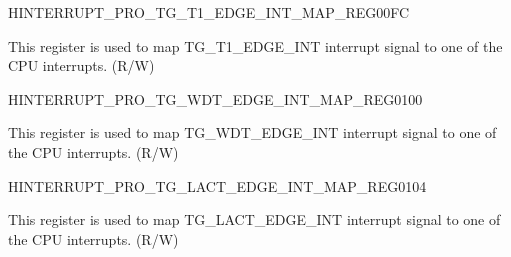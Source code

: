 \begin{register}{H}{INTERRUPT\_PRO\_TG\_T1\_EDGE\_INT\_MAP\_REG}{\hexprefix{}00FC}\label{regdesc:INTERRUPTPROTGT1EDGEINTMAPREG}
%
%
\regnewline%
\begin{regdesc}\begin{reglist}
\label{fielddesc:INTERRUPTPROTGT1EDGEINTMAP}\item [INTERRUPT\_PRO\_TG\_T1\_EDGE\_INT\_MAP] This register is used to map TG\_T1\_EDGE\_INT interrupt signal to one of the CPU interrupts. (R/W)
\end{reglist}\end{regdesc}
\end{register}


\begin{register}{H}{INTERRUPT\_PRO\_TG\_WDT\_EDGE\_INT\_MAP\_REG}{\hexprefix{}0100}\label{regdesc:INTERRUPTPROTGWDTEDGEINTMAPREG}
%
%
\regnewline%
\begin{regdesc}\begin{reglist}
\label{fielddesc:INTERRUPTPROTGWDTEDGEINTMAP}\item [INTERRUPT\_PRO\_TG\_WDT\_EDGE\_INT\_MAP] This register is used to map TG\_WDT\_EDGE\_INT interrupt signal to one of the CPU interrupts. (R/W)
\end{reglist}\end{regdesc}
\end{register}


\begin{register}{H}{INTERRUPT\_PRO\_TG\_LACT\_EDGE\_INT\_MAP\_REG}{\hexprefix{}0104}\label{regdesc:INTERRUPTPROTGLACTEDGEINTMAPREG}
%
%
\regnewline%
\begin{regdesc}\begin{reglist}
\label{fielddesc:INTERRUPTPROTGLACTEDGEINTMAP}\item [INTERRUPT\_PRO\_TG\_LACT\_EDGE\_INT\_MAP] This register is used to map TG\_LACT\_EDGE\_INT interrupt signal to one of the CPU interrupts. (R/W)
\end{reglist}\end{regdesc}
\end{register}


